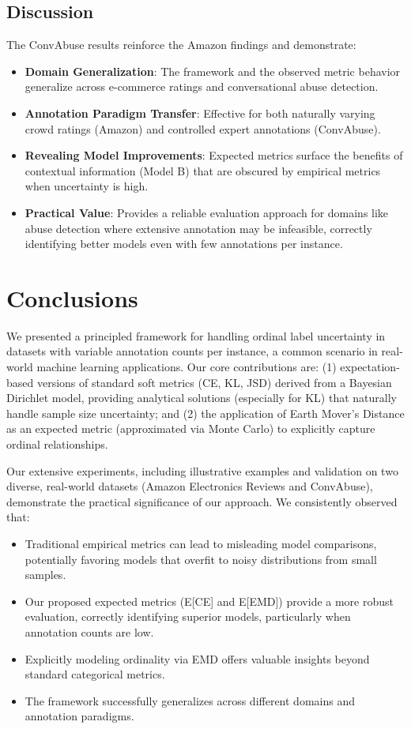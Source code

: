 \documentclass[journal]{IEEEtran}
\begin{document}
\subsection{Discussion}
The ConvAbuse results reinforce the Amazon findings and demonstrate:
\begin{itemize}
    \item \textbf{Domain Generalization}: The framework and the observed metric behavior generalize across e-commerce ratings and conversational abuse detection.
    \item \textbf{Annotation Paradigm Transfer}: Effective for both naturally varying crowd ratings (Amazon) and controlled expert annotations (ConvAbuse).
    \item \textbf{Revealing Model Improvements}: Expected metrics surface the benefits of contextual information (Model B) that are obscured by empirical metrics when uncertainty is high.
    \item \textbf{Practical Value}: Provides a reliable evaluation approach for domains like abuse detection where extensive annotation may be infeasible, correctly identifying better models even with few annotations per instance.
\end{itemize}

\section{Conclusions}

We presented a principled framework for handling ordinal label uncertainty in datasets with variable annotation counts per instance, a common scenario in real-world machine learning applications. Our core contributions are: (1) expectation-based versions of standard soft metrics (CE, KL, JSD) derived from a Bayesian Dirichlet model, providing analytical solutions (especially for KL) that naturally handle sample size uncertainty; and (2) the application of Earth Mover's Distance as an expected metric (approximated via Monte Carlo) to explicitly capture ordinal relationships.

Our extensive experiments, including illustrative examples and validation on two diverse, real-world datasets (Amazon Electronics Reviews and ConvAbuse), demonstrate the practical significance of our approach. We consistently observed that:
\begin{itemize}
    \item Traditional empirical metrics can lead to misleading model comparisons, potentially favoring models that overfit to noisy distributions from small samples.
    \item Our proposed expected metrics (E[CE] and E[EMD]) provide a more robust evaluation, correctly identifying superior models, particularly when annotation counts are low.
    \item Explicitly modeling ordinality via EMD offers valuable insights beyond standard categorical metrics.
    \item The framework successfully generalizes across different domains and annotation paradigms.
\end{itemize}
\end{document}

